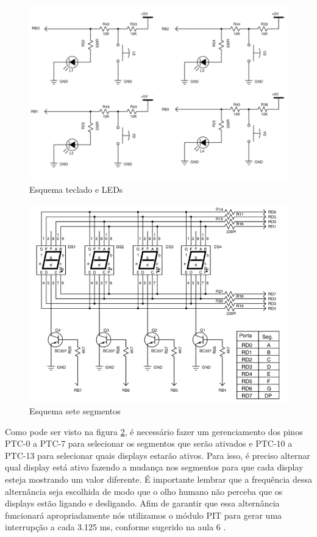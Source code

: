 \documentclass{article}
\begin{document}
\begin{figure}[H]
	\centering
	\includegraphics[width=0.7\linewidth]{esq_ledswi}
	\caption{Esquema teclado e LEDs}
	\label{fig:esq_ledswi}
\end{figure}
\begin{figure}[H]
	\centering
	\includegraphics[width=0.9\linewidth]{esq_7seg}
	\caption{Esquema sete segmentos}
	\label{fig:esq_7seg}
\end{figure}
Como pode ser visto na figura \ref{fig:esq_7seg}, é necessário fazer um gerenciamento dos pinos PTC-0 a PTC-7 para selecionar os segmentos que serão ativados e PTC-10 a PTC-13 para selecionar quais displays estarão ativos. Para isso, é preciso alternar qual display está ativo fazendo a mudança nos segmentos para que cada display esteja mostrando um valor diferente. É importante lembrar que a frequência dessa alternância seja escolhida de modo que o olho humano não perceba que os displays estão ligando e desligando. Afim de garantir que essa alternância funcionará apropriadamente nós utilizamos o módulo PIT para gerar uma interrupção a cada 3.125 ms, conforme sugerido na aula 6 \cite{bb:aula6}. 
\end{document}
